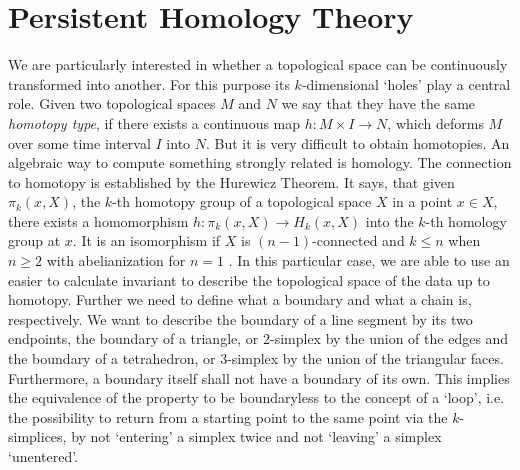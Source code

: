 \documentclass[runningheads]{llncs}
\begin{document}
\section{Persistent Homology Theory}
\label{sec:simplicialhomology}
We are particularly interested in whether a topological space can be continuously transformed into another. For this purpose its $k$-dimensional `holes' play a central role. Given two topological spaces $M$ and $N$ we say that they have the same \textit{homotopy type}, if there exists a continuous map $h: M \times I \rightarrow N$, which deforms $M$ over some time interval $I$ into $N$. But it is very difficult to obtain homotopies. An algebraic way to compute something strongly related is homology. The connection to homotopy is established by the Hurewicz Theorem. It says, that given $\pi_k(x,X)$, the $k$-th homotopy group of a topological space $X$ in a point $x \in X$, there exists a homomorphism $h: \pi_k(x,X) \rightarrow H_k(x,X)$ into the $k$-th homology group at $x$. It is an isomorphism if $X$ is $(n-1)$-connected and $k \leq n$ when $n \geq 2$ with abelianization for $n = 1$ \cite{hatcher2005algebraic}. In this particular case, we are able to use an easier to calculate invariant to describe the topological space of the data up to homotopy. Further we need to define what a boundary and what a chain is, respectively. We want to describe the boundary of a line segment by its two endpoints, the boundary of a triangle, or $2$-simplex by the union of the edges and the boundary of a tetrahedron, or $3$-simplex by the union of the triangular faces. Furthermore, a boundary itself shall not have a boundary of its own. This implies the equivalence of the property to be boundaryless to the concept of a `loop', i.e. the possibility to return from a starting point to the same point via the $k$-simplices, by not `entering' a simplex twice and not `leaving' a simplex `unentered'.
\end{document}
